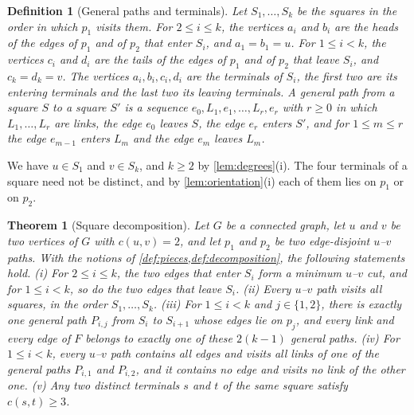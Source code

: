 \documentclass[pdflatex,sn-mathphys-num]{sn-jnl}%
\theoremstyle{thmstyleone}%
\newtheorem{theorem}{Theorem}%
\theoremstyle{thmstyletwo}%
\theoremstyle{thmstylethree}%
\newtheorem{definition}{Definition}%
\begin{document}
\begin{definition}[General paths and terminals]
\label{def:decomposition}
Let $S_1, \dots, S_k$ be the squares in the order in which $p_1$ visits them.
For $2 \leq i \leq k$, the vertices $a_i$ and $b_i$ are the heads of the edges of $p_1$ and of $p_2$ that enter $S_i$, and $a_1 = b_1 = u$.
For $1 \leq i < k$, the vertices $c_i$ and $d_i$ are the tails of the edges of $p_1$ and of $p_2$ that leave $S_i$, and $c_k = d_k = v$.
The vertices $a_i, b_i, c_i, d_i$ are the \emph{terminals} of $S_i$, the first two are its \emph{entering terminals} and the last two its \emph{leaving terminals}.
A \emph{general path} from a square $S$ to a square $S'$ is a sequence $e_0, L_1, e_1, \dots, L_r, e_r$ with $r \geq 0$ in which $L_1, \dots, L_r$ are links, the edge $e_0$ leaves $S$, the edge $e_r$ enters $S'$, and for $1 \leq m \leq r$ the edge $e_{m-1}$ enters $L_m$ and the edge $e_m$ leaves $L_m$.
\end{definition}

We have $u \in S_1$ and $v \in S_k$, and $k \geq 2$ by \cref{lem:degrees}(i).
The four terminals of a square need not be distinct, and by \cref{lem:orientation}(i) each of them lies on $p_1$ or on $p_2$.

\begin{theorem}[Square decomposition]
\label{thm:structure}
Let $G$ be a connected graph, let $u$ and $v$ be two vertices of $G$ with $c(u, v) = 2$, and let $p_1$ and $p_2$ be two edge-disjoint $u$--$v$ paths.
With the notions of \cref{def:pieces,def:decomposition}, the following statements hold.
(i) For $2 \leq i \leq k$, the two edges that enter $S_i$ form a minimum $u$--$v$ cut, and for $1 \leq i < k$, so do the two edges that leave $S_i$.
(ii) Every $u$--$v$ path visits all squares, in the order $S_1, \dots, S_k$.
(iii) For $1 \leq i < k$ and $j \in \{1, 2\}$, there is exactly one general path $P_{i,j}$ from $S_i$ to $S_{i+1}$ whose edges lie on $p_j$, and every link and every edge of $F$ belongs to exactly one of these $2(k - 1)$ general paths.
(iv) For $1 \leq i < k$, every $u$--$v$ path contains all edges and visits all links of one of the general paths $P_{i,1}$ and $P_{i,2}$, and it contains no edge and visits no link of the other one.
(v) Any two distinct terminals $s$ and $t$ of the same square satisfy $c(s, t) \geq 3$.
\end{theorem}
\end{document}
